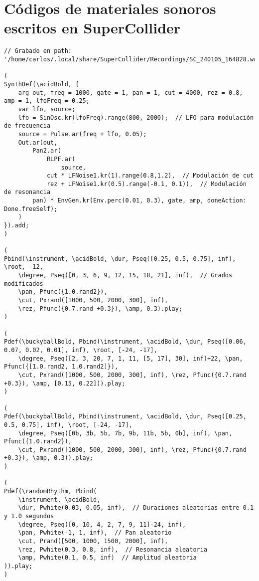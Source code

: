 \section*{Códigos de materiales sonoros escritos en SuperCollider}

\begin{minipage}[t]{1\textwidth}
    \centering
    \begin{lstlisting}[style=SuperCollider-IDE, basicstyle=\footnotesize\ttfamily, numbers=none]
// Grabado en path: '/home/carlos/.local/share/SuperCollider/Recordings/SC_240105_164828.wav'

(
SynthDef(\acidBold, {
    arg out, freq = 1000, gate = 1, pan = 1, cut = 4000, rez = 0.8, amp = 1, lfoFreq = 0.25;
    var lfo, source;
    lfo = SinOsc.kr(lfoFreq).range(800, 2000);  // LFO para modulación de frecuencia
    source = Pulse.ar(freq + lfo, 0.05);
    Out.ar(out,
        Pan2.ar(
            RLPF.ar(
                source,
            cut * LFNoise1.kr(1).range(0.8,1.2),  // Modulación de cut
            rez + LFNoise1.kr(0.5).range(-0.1, 0.1)),  // Modulación de resonancia
        pan) * EnvGen.kr(Env.perc(0.01, 0.3), gate, amp, doneAction: Done.freeSelf);
    )
}).add;
)

(
Pbind(\instrument, \acidBold, \dur, Pseq([0.25, 0.5, 0.75], inf), \root, -12,
    \degree, Pseq([0, 3, 6, 9, 12, 15, 18, 21], inf),  // Grados modificados
    \pan, Pfunc({1.0.rand2}),
    \cut, Pxrand([1000, 500, 2000, 300], inf),
    \rez, Pfunc({0.7.rand +0.3}), \amp, 0.3).play;
)

(
Pdef(\buckyballBold, Pbind(\instrument, \acidBold, \dur, Pseq([0.06, 0.07, 0.02, 0.01], inf), \root, [-24, -17],
    \degree, Pseq([2, 3, 20, 7, 1, 11, [5, 17], 30], inf)+22, \pan, Pfunc({[1.0.rand2, 1.0.rand2]}),
    \cut, Pxrand([1000, 500, 2000, 300], inf), \rez, Pfunc({0.7.rand +0.3}), \amp, [0.15, 0.22])).play;
)

(
Pdef(\buckyballBold, Pbind(\instrument, \acidBold, \dur, Pseq([0.25, 0.5, 0.75], inf), \root, [-24, -17],
    \degree, Pseq([0b, 3b, 5b, 7b, 9b, 11b, 5b, 0b], inf), \pan, Pfunc({1.0.rand2}),
    \cut, Pxrand([1000, 500, 2000, 300], inf), \rez, Pfunc({0.7.rand +0.3}), \amp, 0.3)).play;
)

(
Pdef(\randomRhythm, Pbind(
    \instrument, \acidBold,
    \dur, Pwhite(0.03, 0.05, inf),  // Duraciones aleatorias entre 0.1 y 1.0 segundos
    \degree, Pseq([0, 10, 4, 2, 7, 9, 11]-24, inf),
    \pan, Pwhite(-1, 1, inf),  // Pan aleatorio
    \cut, Prand([500, 1000, 1500, 2000], inf),
    \rez, Pwhite(0.3, 0.8, inf),  // Resonancia aleatoria
    \amp, Pwhite(0.1, 0.5, inf)  // Amplitud aleatoria
)).play;
)
    \end{lstlisting}
    \vspace{1cm}
\end{minipage}






